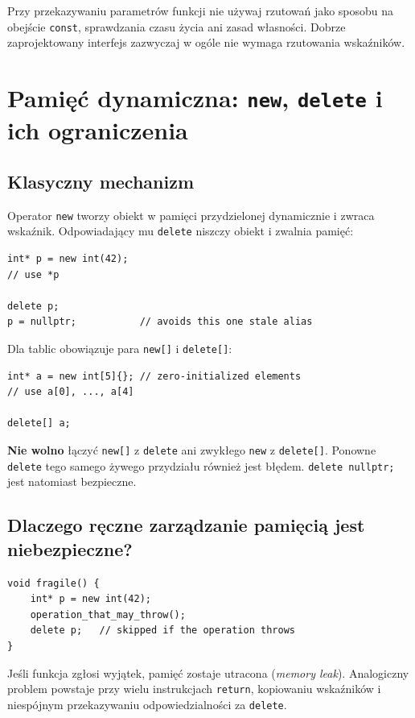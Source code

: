 Przy przekazywaniu parametrów funkcji nie używaj rzutowań
jako sposobu na obejście \texttt{const}, sprawdzania czasu życia
ani zasad własności. Dobrze zaprojektowany interfejs zazwyczaj
w ogóle nie wymaga rzutowania wskaźników.

\section{Pamięć dynamiczna: \texttt{new}, \texttt{delete} i ich ograniczenia}

\subsection{Klasyczny mechanizm}

Operator \texttt{new} tworzy obiekt w pamięci przydzielonej
dynamicznie i zwraca wskaźnik. Odpowiadający mu
\texttt{delete} niszczy obiekt i zwalnia pamięć:

\begin{lstlisting}
int* p = new int(42);
// use *p

delete p;
p = nullptr;           // avoids this one stale alias
\end{lstlisting}

Dla tablic obowiązuje para \texttt{new[]} i \texttt{delete[]}:

\begin{lstlisting}
int* a = new int[5]{}; // zero-initialized elements
// use a[0], ..., a[4]

delete[] a;
\end{lstlisting}

\textbf{Nie wolno} łączyć \texttt{new[]} z \texttt{delete} ani
zwykłego \texttt{new} z \texttt{delete[]}. Ponowne
\texttt{delete} tego samego żywego przydziału również jest błędem.
\texttt{delete nullptr;} jest natomiast bezpieczne.

\subsection{Dlaczego ręczne zarządzanie pamięcią jest niebezpieczne?}

\begin{lstlisting}
void fragile() {
    int* p = new int(42);
    operation_that_may_throw();
    delete p;   // skipped if the operation throws
}
\end{lstlisting}

Jeśli funkcja zgłosi wyjątek, pamięć zostaje utracona
(\emph{memory leak}). Analogiczny problem powstaje przy
wielu instrukcjach \texttt{return}, kopiowaniu wskaźników i
niespójnym przekazywaniu odpowiedzialności za \texttt{delete}.

